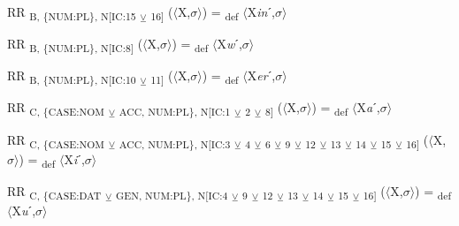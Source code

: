 {\begin{exe}
 RR \textsubscript{B, \{NUM:PL\}, N[IC:15} \textsubscript{${\veebar}$}\textsubscript{ 16]} ($\langle$X,$\sigma $$\rangle$) = \textsubscript{def} $\langle$X\textit{in}ˊ,$\sigma $$\rangle$
\end{exe}

\begin{exe}
 RR \textsubscript{B, \{NUM:PL\}, N[IC:8]} ($\langle$X,$\sigma $$\rangle$) = \textsubscript{def} $\langle$X\textit{w}ˊ,$\sigma $$\rangle$
\end{exe}

\begin{exe}
 RR \textsubscript{B, \{NUM:PL\}, N[IC:10} \textsubscript{${\veebar}$}\textsubscript{ 11]} ($\langle$X,$\sigma $$\rangle$) = \textsubscript{def} $\langle$X\textit{er}ˊ,$\sigma $$\rangle$
\end{exe}

\begin{exe}
 RR \textsubscript{C, \{CASE:NOM} \textsubscript{${\veebar}$}\textsubscript{ ACC, NUM:PL\}, N[IC:1} \textsubscript{${\veebar}$}\textsubscript{ 2} \textsubscript{${\veebar}$}\textsubscript{ 8]} ($\langle$X,$\sigma $$\rangle$) = \textsubscript{def} $\langle$X\textit{a}ˊ,$\sigma $$\rangle$
\end{exe}

\begin{exe}
 RR \textsubscript{C, \{CASE:NOM} \textsubscript{${\veebar}$}\textsubscript{ ACC, NUM:PL\}, N[IC:3} \textsubscript{${\veebar}$}\textsubscript{ 4} \textsubscript{${\veebar}$}\textsubscript{ 6} \textsubscript{${\veebar}$}\textsubscript{ 9} \textsubscript{${\veebar}$}\textsubscript{ 12} \textsubscript{${\veebar}$}\textsubscript{ 13} \textsubscript{${\veebar}$}\textsubscript{ 14} \textsubscript{${\veebar}$}\textsubscript{ 15} \textsubscript{${\veebar}$}\textsubscript{ 16]} ($\langle$X,$\sigma $$\rangle$) = \textsubscript{def} $\langle$X\textit{i}ˊ,$\sigma $$\rangle$
\end{exe}

\begin{exe}
 RR \textsubscript{C, \{CASE:DAT} \textsubscript{${\veebar}$}\textsubscript{ GEN, NUM:PL\}, N[IC:4} \textsubscript{${\veebar}$}\textsubscript{ 9} \textsubscript{${\veebar}$}\textsubscript{ 12} \textsubscript{${\veebar}$}\textsubscript{ 13} \textsubscript{${\veebar}$}\textsubscript{ 14} \textsubscript{${\veebar}$}\textsubscript{ 15} \textsubscript{${\veebar}$}\textsubscript{ 16]} ($\langle$X,$\sigma $$\rangle$) = \textsubscript{def} $\langle$X\textit{u}ˊ,$\sigma $$\rangle$
\end{exe}

}
